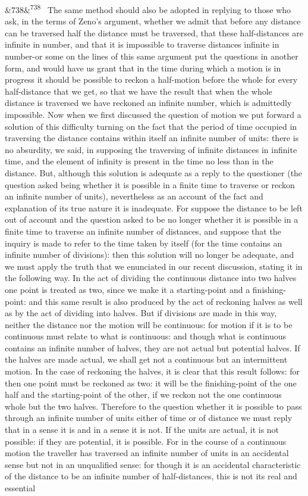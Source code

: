 \documentclass[12pt]{article}
\newcommand{\para}[1][]{\par\noindent\ifx&#1&\else\textsuperscript{\footnotesize #1}~\fi}
\begin{document}
\para[738] The same method should also be adopted in replying to those who ask, in the terms of Zeno's argument, whether we admit that before any distance can be traversed half the distance must be traversed, that these half-distances are infinite in number, and that it is impossible to traverse distances infinite in number-or some on the lines of this same argument put the questions in another form, and would have us grant that in the time during which a motion is in progress it should be possible to reckon a half-motion before the whole for every half-distance that we get, so that we have the result that when the whole distance is traversed we have reckoned an infinite number, which is admittedly impossible. Now when we first discussed the question of motion we put forward a solution of this difficulty turning on the fact that the period of time occupied in traversing the distance contains within itself an infinite number of units: there is no absurdity, we said, in supposing the traversing of infinite distances in infinite time, and the element of infinity is present in the time no less than in the distance. But, although this solution is adequate as a reply to the questioner (the question asked being whether it is possible in a finite time to traverse or reckon an infinite number of units), nevertheless as an account of the fact and explanation of its true nature it is inadequate. For suppose the distance to be left out of account and the question asked to be no longer whether it is possible in a finite time to traverse an infinite number of distances, and suppose that the inquiry is made to refer to the time taken by itself (for the time contains an infinite number of divisions): then this solution will no longer be adequate, and we must apply the truth that we enunciated in our recent discussion, stating it in the following way. In the act of dividing the continuous distance into two halves one point is treated as two, since we make it a starting-point and a finishing-point: and this same result is also produced by the act of reckoning halves as well as by the act of dividing into halves. But if divisions are made in this way, neither the distance nor the motion will be continuous: for motion if it is to be continuous must relate to what is continuous: and though what is continuous contains an infinite number of halves, they are not actual but potential halves. If the halves are made actual, we shall get not a continuous but an intermittent motion. In the case of reckoning the halves, it is clear that this result follows: for then one point must be reckoned as two: it will be the finishing-point of the one half and the starting-point of the other, if we reckon not the one continuous whole but the two halves. Therefore to the question whether it is possible to pass through an infinite number of units either of time or of distance we must reply that in a sense it is and in a sense it is not. If the units are actual, it is not possible: if they are potential, it is possible. For in the course of a continuous motion the traveller has traversed an infinite number of units in an accidental sense but not in an unqualified sense: for though it is an accidental characteristic of the distance to be an infinite number of half-distances, this is not its real and essential 
\end{document}
